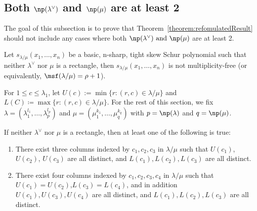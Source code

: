 \subsection{Both \texorpdfstring{$\np (\lambda^\vee)$}{np(lambda vee)} and \texorpdfstring{$\np (\mu)$}{np(mu)} are at least 2}

The goal of this subsection is to prove that Theorem~\ref{theorem:refomulatedResult} should not include any cases where both $\np (\lambda^\vee) \text{ and }\np (\mu)$ are at least 2.

\begin{theorem}
\label{thm:lambdamunotrectangle}
Let $s_{\lambda/\mu}(x_1,\ldots,x_n)$ be a basic, n-sharp, tight skew Schur polynomial such that neither $\lambda^\vee$ nor $\mu$ is a rectangle, then $s_{\lambda/\mu}(x_1,\ldots,x_n)$ is not multiplicity-free (or equivalently, $\msf (\lambda/\mu) = \rho+1$).
\end{theorem}

For $1 \leq c \leq \lambda_1$, let $U(c) := \min\{r:(r,c)\in \lambda / \mu\}$ and $L(C) \coloneqq \max\{r:(r,c)\in \lambda / \mu\}$. For the rest of this section, we fix $\lambda = (\lambda_1^{l_1},\dots, \lambda_p^{l_p})$ and $\mu = (\mu_1^{k_1},\dots, \mu_q^{k_q})$ with $p = \np (\lambda)$ and $q = \np (\mu)$.


\begin{lemma}
\label{lem:nonrect}
 If neither $\lambda^\vee$ nor $\mu$ is a rectangle, then at least one of the following is true:
 \begin{enumerate}[label=(\Roman{*})]
 \item\label{lemma3.4_1} There exist three columns indexed by $c_1,c_2,c_3$ in $\lambda/\mu$ such that $U(c_1)$, $U(c_2)$, $U(c_3)$ are all distinct, and $L(c_1),L(c_2),L(c_3)$ are all distinct.
 \item\label{lemma3.4_2} There exist four columns indexed by $c_1,c_2,c_3,c_4$ in $\lambda/\mu$ such that $U(c_1)=U(c_2)$,$L(c_3)=L(c_4)$, and in addition $U(c_1),U(c_3),U(c_4)$ are all distinct, and $L(c_1),L(c_2),L(c_3)$ are all distinct.
 \end{enumerate}
\end{lemma}

